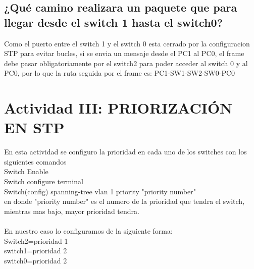 \documentclass[spanish]{udpreport}
\begin{document}
\subsection{¿Qué camino realizara un paquete que para llegar desde el switch 1 hasta el switch0?}
Como el puerto entre el switch 1 y el switch 0 esta cerrado por la configuracion STP para evitar bucles, si se envia un mensaje desde el PC1 al PC0, el frame debe pasar obligatoriamente por el switch2 para poder acceder al switch 0 y al PC0, por lo que la ruta seguida por el frame es: PC1-SW1-SW2-SW0-PC0

\section{Actividad III: PRIORIZACIÓN EN STP}
En esta actividad se configuro la prioridad en cada uno de los switches con los siguientes comandos\\
Switch Enable\\
Switch configure terminal\\
Switch(config) spanning-tree vlan 1 priority "priority number"\\

en donde "priority number" es el numero de la prioridad que tendra el switch, mientras mas bajo, mayor prioridad tendra.\\\\

En nuestro caso lo configuramos de la siguiente forma:\\
Switch2=prioridad 1\\
switch1=prioridad 2\\
switch0=prioridad 2\\
\end{document}
